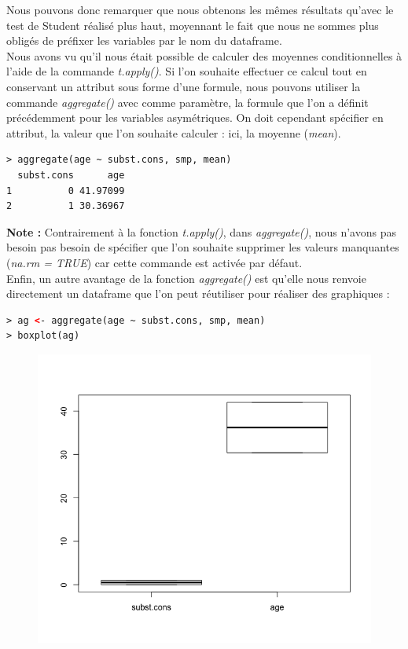 Nous pouvons donc remarquer que nous obtenons les mêmes résultats qu'avec le test de Student réalisé plus haut, moyennant le fait que nous ne sommes plus obligés de préfixer les variables par le nom du dataframe.\newline
\\
Nous avons vu qu'il nous était possible de calculer des moyennes conditionnelles à l'aide de la commande \textit{t.apply()}. Si l'on souhaite effectuer ce calcul tout en conservant un attribut sous forme d'une formule, nous pouvons utiliser la commande \textit{aggregate()} avec comme paramètre, la formule que l'on a définit précédemment pour les variables asymétriques. On doit cependant spécifier en attribut, la valeur que l'on souhaite calculer : ici, la moyenne (\textit{mean}).

\begin{lstlisting}[language=html]
> aggregate(age ~ subst.cons, smp, mean)
  subst.cons      age
1          0 41.97099
2          1 30.36967
\end{lstlisting}

\textbf{Note : } Contrairement à la fonction \textit{t.apply()}, dans \textit{aggregate()}, nous n'avons pas besoin pas besoin de spécifier que l'on souhaite supprimer les valeurs manquantes (\textit{na.rm = TRUE}) car cette commande est activée par défaut.\newline\\
Enfin, un autre avantage de la fonction \textit{aggregate()} est qu'elle nous renvoie directement un dataframe que l'on peut réutiliser pour réaliser des graphiques :

\begin{lstlisting}[language=html]
> ag <- aggregate(age ~ subst.cons, smp, mean)
> boxplot(ag) 
\end{lstlisting}

\begin{figure}[H]\begin{center}\includegraphics[scale=0.5]{ilu/cj.png}\end{center}\end{figure}

